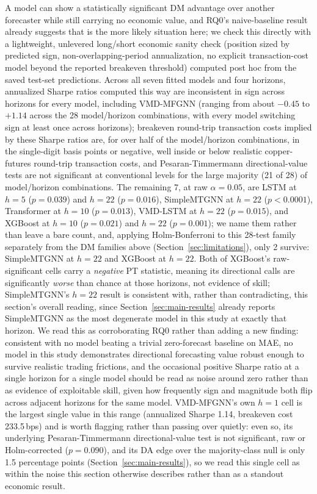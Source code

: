 \documentclass[journal]{IEEEtran}
\begin{document}
A model can show a statistically significant DM advantage over another forecaster while still carrying no economic value, and RQ0's naive-baseline result already suggests that is the more likely situation here; we check this directly with a lightweight, unlevered long/short economic sanity check (position sized by predicted sign, non-overlapping-period annualization, no explicit transaction-cost model beyond the reported breakeven threshold) computed post hoc from the saved test-set predictions. Across all seven fitted models and four horizons, annualized Sharpe ratios computed this way are inconsistent in sign across horizons for every model, including VMD-MFGNN (ranging from about $-0.45$ to $+1.14$ across the 28 model/horizon combinations, with every model switching sign at least once across horizons); breakeven round-trip transaction costs implied by these Sharpe ratios are, for over half of the model/horizon combinations, in the single-digit basis points or negative, well inside or below realistic copper-futures round-trip transaction costs, and Pesaran-Timmermann directional-value tests \citep{PesaranTimmermann1992} are not significant at conventional levels for the large majority (21 of 28) of model/horizon combinations. The remaining 7, at raw $\alpha=0.05$, are LSTM at $h=5$ ($p=0.039$) and $h=22$ ($p=0.016$), SimpleMTGNN at $h=22$ ($p<0.0001$), Transformer at $h=10$ ($p=0.013$), VMD-LSTM at $h=22$ ($p=0.015$), and XGBoost at $h=10$ ($p=0.021$) and $h=22$ ($p=0.001$); we name them rather than leave a bare count, and, applying Holm-Bonferroni to this 28-test family separately from the DM families above (Section~\ref{sec:limitations}), only 2 survive: SimpleMTGNN at $h=22$ and XGBoost at $h=22$. Both of XGBoost's raw-significant cells carry a \emph{negative} PT statistic, meaning its directional calls are significantly \emph{worse} than chance at those horizons, not evidence of skill; SimpleMTGNN's $h=22$ result is consistent with, rather than contradicting, this section's overall reading, since Section~\ref{sec:main-results} already reports SimpleMTGNN as the most degenerate model in this study at exactly that horizon. We read this as corroborating RQ0 rather than adding a new finding: consistent with no model beating a trivial zero-forecast baseline on MAE, no model in this study demonstrates directional forecasting value robust enough to survive realistic trading frictions, and the occasional positive Sharpe ratio at a single horizon for a single model should be read as noise around zero rather than as evidence of exploitable skill, given how frequently sign and magnitude both flip across adjacent horizons for the same model. VMD-MFGNN's own $h=1$ cell is the largest single value in this range (annualized Sharpe 1.14, breakeven cost 233.5\,bps) and is worth flagging rather than passing over quietly: even so, its underlying Pesaran-Timmermann directional-value test is not significant, raw or Holm-corrected ($p=0.090$), and its DA edge over the majority-class null is only 1.5 percentage points (Section~\ref{sec:main-results}), so we read this single cell as within the noise this section otherwise describes rather than as a standout economic result.
\end{document}
